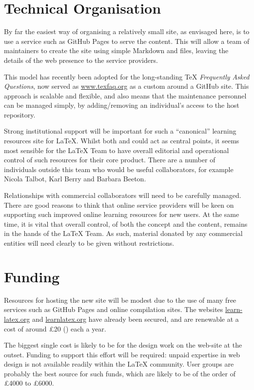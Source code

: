 \documentclass{article}
\begin{document}
\section{Technical Organisation}

By far the easiest way of organising a relatively small site, as envisaged
here, is to use a service such as GitHub Pages to serve the content. This will
allow a team of maintainers to create the site using simple Markdown and
 files, leaving the details of the web presence to the service
providers.

This model has recently been adopted for the long-standing \TeX{}
\textsl{Frequently Asked Questions}, now served as \url{www.texfaq.org} as a
custom  around a GitHub site. This approach is scalable and flexible,
and also means that the maintenance personnel can be managed simply, by
adding/removing an individual's access to the host repository.

Strong institutional support will be important for such a \enquote{canonical}
learning resources site for \LaTeX{}. Whilst both  and 
could act as central points, it seems most sensible for the \LaTeX{} Team to
have overall editorial and operational control of such resources for their core
product. There are a number of individuals outside this team who would be
useful collaborators, for example Nicola Talbot, Karl Berry and Barbara Beeton.

Relationships with commercial collaborators will need to be carefully managed.
There are good reasons to think that online service providers will be keen on
supporting such improved online learning resources for new users. At the same
time, it is vital that overall control, of both the concept and the content,
remains in the hands of the \LaTeX{} Team. As such, material donated by any
commercial entities will need clearly to be given without restrictions.

\section{Funding}

Resources for hosting the new site will be modest due to the use of many free
services such as GitHub Pages and online compilation sites. The websites
\url{learn-latex.org} and \url{learnlatex.org} have already been secured, and
are renewable at a cost of around \pounds 20 () each a year.

The biggest single cost is likely to be for the design work on the web-site at
the outset. Funding to support this effort will be required: unpaid expertise
in web design is not available readily within the \LaTeX{} community. User
groups are probably the best source for such funds, which are likely to be of
the order of \pounds 4000 to \pounds 6000.
\end{document}

